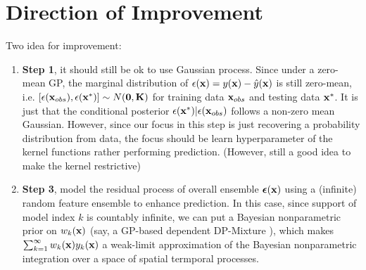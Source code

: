 \documentclass[11pt]{article}
\theoremstyle{definition}
\begin{document}
\newpage
\section{\textbf{Direction of Improvement}}

Two idea for improvement: 
\begin{enumerate}
\item \textbf{Step 1}, it should still be ok to use Gaussian process. Since under a zero-mean GP, the marginal distribution of $\epsilon({\bf x}) = y({\bf x}) - \hat{y}({\bf x})$ is still zero-mean, i.e. $[\epsilon({\bf x}_{obs}), \epsilon({\bf x}^*)] \sim N({\bf 0}, {\bf K})$ for  training data ${\bf x}_{obs}$ and testing data ${\bf x}^*$. It is just that the conditional posterior $\epsilon({\bf x}^*)|\epsilon({\bf x}_{obs})$ follows a non-zero mean Gaussian. However, since our focus in this step is just recovering a probability distribution from data, the focus should be learn hyperparameter of the kernel functions rather performing prediction. (However, still a good idea to make the kernel restrictive)
\item \textbf{Step 3}, model the residual process of overall ensemble $\boldsymbol{\epsilon}({\bf x})$ using a (infinite) random feature ensemble \citep{rahimi_weighted_2009} to enhance prediction. In this case, since support of model index $k$ is countably infinite, we can put a Bayesian nonparametric prior on $w_k({\bf x})$ (say, a GP-based dependent DP-Mixture \cite{jara_class_2011}), which makes $\sum_{k=1}^\infty w_k({\bf x})y_k({\bf x})$ a weak-limit approximation of the Bayesian nonparametric integration over a space of spatial termporal processes.
\end{enumerate}

\clearpage

\end{document}
